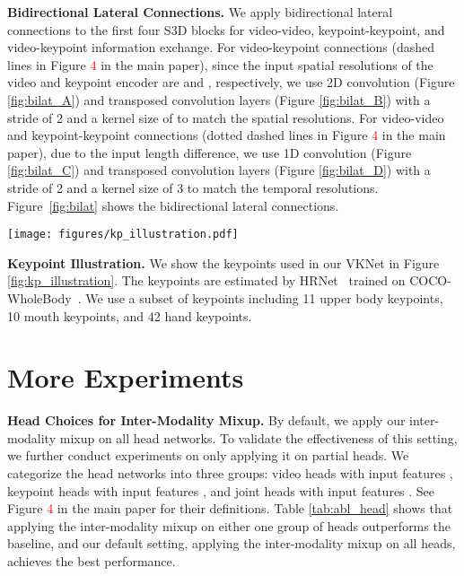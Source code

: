 \documentclass[10pt,twocolumn,letterpaper]{article}
\def \tbf{\textbf}
\begin{document}
\noindent\textbf{Bidirectional Lateral Connections.}
We apply bidirectional lateral connections \cite{duan2022revisiting} to the first four S3D blocks for video-video, keypoint-keypoint, and video-keypoint information exchange.
For video-keypoint connections (dashed lines in Figure \textcolor{red}{4} in the main paper), since the input spatial resolutions of the video and keypoint encoder are  and , respectively, we use 2D convolution (Figure \ref{fig:bilat_A}) and transposed convolution layers (Figure \ref{fig:bilat_B}) with a stride of 2 and a kernel size of  to match the spatial resolutions.
For video-video and keypoint-keypoint connections (dotted dashed lines in Figure \textcolor{red}{4} in the main paper), due to the input length difference, we use 1D convolution (Figure \ref{fig:bilat_C}) and transposed convolution layers (Figure \ref{fig:bilat_D}) with a stride of 2 and a kernel size of 3 to match the temporal resolutions. Figure~\ref{fig:bilat} shows the bidirectional lateral connections.

\begin{figure*}[t]
\centering
\texttt{[image: figures/kp\_illustration.pdf]}
\caption{Illustration of the keypoints (11 upper body keypoints, 10 mouth keypoints, and 42 hand keypoints) used in our VKNet.}
\label{fig:kp_illustration}
\end{figure*}

\noindent\textbf{Keypoint Illustration.} We show the keypoints used in our VKNet in Figure \ref{fig:kp_illustration}. The keypoints are estimated by HRNet~\cite{sun2019deep} trained on COCO-WholeBody~\cite{jin2020whole}.
We use a subset of keypoints including 11 upper body keypoints, 10 mouth keypoints, and 42 hand keypoints.


\section{More Experiments}
\noindent\tbf{Head Choices for Inter-Modality Mixup.}
By default, we apply our inter-modality mixup on all head networks.
To validate the effectiveness of this setting, we further conduct experiments on only applying it on partial heads.
We categorize the head networks into three groups: video heads with input features , keypoint heads with input features , and joint heads with input features . See Figure \textcolor{red}{4} in the main paper for their definitions.
Table \ref{tab:abl_head} shows that applying the inter-modality mixup on either one group of heads outperforms the baseline, and our default setting, applying the inter-modality mixup on all heads, achieves the best performance.
\end{document}
